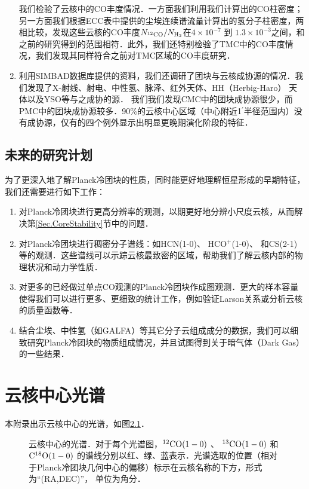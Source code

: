 \documentclass[UTF8, nocolorlinks]{pkuthss}
\newcommand{\coaa}{$\rm^{12}CO(1-0)$ }
\newcommand{\cobb}{$\rm^{13}CO(1-0)$ }
\newcommand{\cocc}{$\rm C^{18}O(1-0)$ }
\newcommand{\arcmin}{$^{\prime}$}
\begin{document}
\begin{enumerate}
	    	我们检验了云核中的CO丰度情况．一方面我们利用我们计算出的CO柱密度；另一方面我们根据ECC表中提供的尘埃连续谱流量计算出的氢分子柱密度，两相比较，发现这些云核的CO丰度$N_{\rm^{12}CO}/N_{\rm H_{2}}$在$4\times 10^{-7}$ 到 $1.3\times 10^{-3 }$之间，和之前的研究得到的范围相符\supercite{1988ApJ...334..771V}．此外，我们还特别检验了TMC中的CO丰度情况，我们发现其同样符合之前对TMC区域的CO丰度研究\supercite{1982ApJ...262..590F}．
	    \item
	    	利用SIMBAD数据库提供的资料，我们还调研了团块与云核成协源的情况．我们发现了X-射线、射电、中性氢、脉泽、红外天体、HH（Herbig-Haro） 天体以及YSO等与之成协的源． 我们我们发现CMC中的团块成协源很少，而PMC中的团块成协源较多．90\%的云核中心区域（中心附近1\arcmin 半径范围内）没有成协源，仅有的四个例外显示出明显更晚期演化阶段的特征．
    	\end{enumerate}
	\section{未来的研究计划}
		为了更深入地了解Planck冷团块的性质，同时能更好地理解恒星形成的早期特征，我们还需要进行如下工作：
		\begin{enumerate}
		 \item
		 	对Planck冷团块进行更高分辨率的观测，以期更好地分辨小尺度云核，从而解决第\ref{Sec.CoreStability}节中的问题．
	     \item 
	     	对Planck冷团块进行稠密分子谱线：如HCN(1-0)、 HCO$^+$(1-0)、 和CS(2-1)等的观测．这些谱线可以示踪云核最致密的区域，帮助我们了解云核内部的物理状况和动力学性质．
	     \item
	     	对更多的已经做过单点CO观测的Planck冷团块作成图观测．更大的样本容量使得我们可以进行更多、更细致的统计工作，例如验证Larson\supercite{1981MNRAS.194..809L}关系或分析云核的质量函数等．
	     \item
	     	结合尘埃、中性氢（如GALFA\supercite{2012ApJ...758...44S}）等其它分子云组成成分的数据，我们可以细致研究Planck冷团块的物质组成情况，并且试图得到关于暗气体\supercite{2005Sci...307.1292G}（Dark Gas）的一些结果．
    	\end{enumerate}
\appendix 

\printbibliography[heading = bibintoc]

\chapter{云核中心光谱}\label{App.Spectra}
	本附录出示云核中心的光谱，如图\ref{Fig.Spectra}．

	\begin{figure}[h]
		\caption{云核中心的光谱．对于每个光谱图，\coaa 、 \cobb 和 \cocc   的谱线分别以红、绿、蓝表示．光谱选取的位置（相对于Planck冷团块几何中心的偏移）标示在云核名称的下方，形式为“(RA,DEC)”， 单位为角分．\label{Fig.Spectra}}
	\end{figure}
		\vspace{-4mm}
\end{document}
